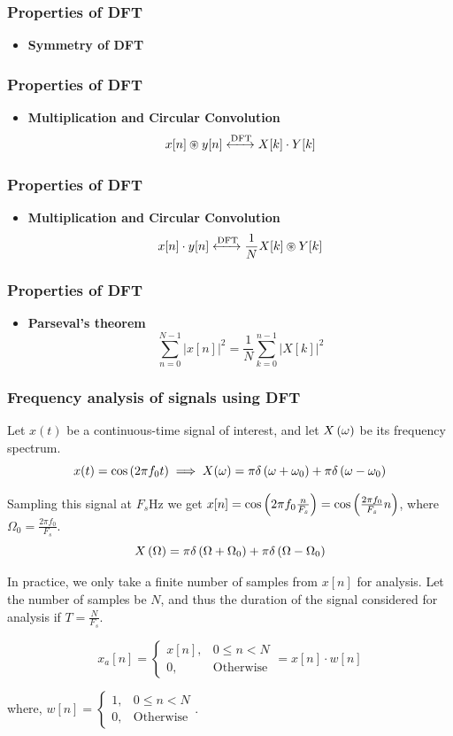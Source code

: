 \documentclass[aspectratio=169]{beamer}
\let\olditem\item
\renewcommand{\item}{\setlength{\itemsep}{\fill}\olditem}
\def\lp{\ensuremath\left(}
\def\rp{\ensuremath\right)}
\begin{document}
\begin{frame}[t]
  \frametitle{Properties of DFT}
  \begin{itemize}
    \item \textbf{Symmetry of DFT}
  \end{itemize}
\end{frame}


\begin{frame}[t]
  \frametitle{Properties of DFT}
  \begin{itemize}
    \item \textbf{Multiplication and Circular Convolution}
    \[ x[n] \circledast y[n] \xleftrightarrow{\text{DFT}} X[k] \cdot Y[k] \]
  \end{itemize}
\end{frame}


\begin{frame}[t]
  \frametitle{Properties of DFT}
  \begin{itemize}
    \item \textbf{Multiplication and Circular Convolution}
    \[ x[n] \cdot y[n] \xleftrightarrow{\text{DFT}} \frac{1}{N} X[k] \circledast Y[k] \]
  \end{itemize}
\end{frame}


\begin{frame}[t]
  \frametitle{Properties of DFT}
  \begin{itemize}
    \item \textbf{Parseval's theorem}
    \[ \sum_{n=0}^{N-1} \vert x[n] \vert^2 = \frac{1}{N} \sum_{k=0}^{n-1} \vert X[k] \vert^2 \]
  \end{itemize}
\end{frame}


\begin{frame}[t]
  \frametitle{Frequency analysis of signals using DFT}
  Let $x(t)$ be a continuous-time signal of interest, and let $X\lp \omega \rp$ be its frequency spectrum.
  \[ x(t) = \cos \lp 2\pi f_0 t\rp \implies X(\omega) = \pi \delta\lp \omega + \omega_0\rp +  \pi \delta\lp \omega - \omega_0\rp  \]

  Sampling this signal at $F_s$Hz we get $x[n] = \cos \lp 2\pi f_0 \frac{n}{F_s}\rp = \cos \lp \frac{2\pi f_0}{F_s}n\rp$, where $\Omega_0 = \frac{2\pi f_0}{F_s}$.
  \[ X\lp \Omega \rp = \pi \delta\lp \Omega + \Omega_0\rp + \pi \delta\lp \Omega - \Omega_0 \rp \]

  In practice, we only take a finite number of samples from $x[n]$ for analysis. Let the number of samples be $N$, and thus the duration of the signal considered for analysis if $T = \frac{N}{F_s}$.

  \[ x_a[n] = \begin{cases} x[n], & 0 \leq n < N \\ 0, & \text{Otherwise} \end{cases} = x[n] \cdot w[n] \]

  where, $w[n] = \begin{cases} 1, & 0 \leq n < N \\ 0, & \text{Otherwise} \end{cases}$.
\end{frame}
\end{document}
